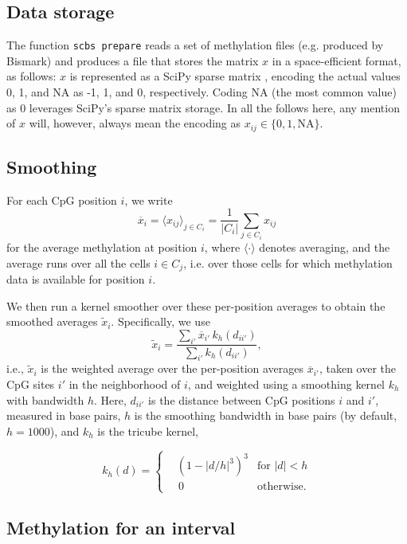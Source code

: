 \documentclass[twocolumn,10pt]{article}
\newcommand{\todo}[1]{[\textcolor{orange}{#1}]}
\begin{document}
\subsection{Data storage}

The function \texttt{scbs prepare} reads a set of methylation files (e.g. produced by Bismark) and produces a file that stores the matrix $x$ in a space-efficient format, as follows: $x$ is represented as a SciPy sparse matrix \citep{SciPy}, encoding the actual values 0, 1, and NA as -1, 1, and 0, respectively. Coding NA (the most common value) as 0 leverages SciPy's sparse matrix storage. In all the follows here, any mention of $x$ will, however, always mean the encoding as $x_{ij}\in\{0,1,\text{NA}\}$.

\subsection{Smoothing}

For each CpG position $i$, we write 
$$\overline{x}_i=\langle x_{ij} \rangle_{j\in C_i} = \frac{1}{|C_i|}\sum_{j\in C_i} x_{ij}$$ 
for the average methylation at position $i$, where $\langle\cdot\rangle$ denotes averaging, and the average runs over all the cells $i\in C_j$, i.e. over those cells for which methylation data is available for position $i$.


We then run a kernel smoother over these per-position averages to obtain the smoothed averages $\tilde x_i$. Specifically, we use
\[ \tilde x_i = \frac{\sum_{i'} \overline x_{i'}\, k_h(d_{ii'})}{\sum_{i'} k_h(d_{ii'})},\]
i.e., $\tilde x_i$ is the weighted average over the per-position averages $\overline{x}_{i'}$, taken over the CpG sites $i'$ in the neighborhood of $i$, and weighted using a smoothing kernel $k_h$ with bandwidth $h$. Here, $d_{ii'}$ is the distance between CpG positions $i$ and $i'$, measured in base pairs, $h$ is the smoothing bandwidth in base pairs (by default, $h=1000$), and $k_h$ is the tricube kernel,

\[ k_h(d) = \left\{
\begin{aligned}
    &\left(1-|d/h|^3\right)^3 &\text{for } |d|<h \\
    &\,0 &\text{otherwise}. 
\end{aligned}
\right.
\]

\subsection{Methylation for an interval}
\end{document}
